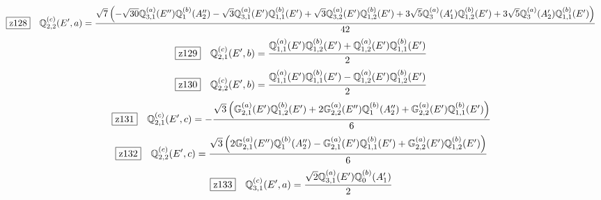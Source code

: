 \documentclass[fleqn,10pt,landscape]{jsarticle}
\begin{document}
\begin{dmath*}
\hspace*{3mm}\fbox{z128}\quad \mathbb{Q}_{2,2}^{(c)}(E^{\prime},a)=\frac{\sqrt{7} \left(- \sqrt{30} \mathbb{Q}_{3,1}^{(a)}(E^{\prime\prime}) \mathbb{Q}_{1}^{(b)}(A_{2}^{\prime\prime}) - \sqrt{3} \mathbb{Q}_{3,1}^{(a)}(E^{\prime}) \mathbb{Q}_{1,1}^{(b)}(E^{\prime}) + \sqrt{3} \mathbb{Q}_{3,2}^{(a)}(E^{\prime}) \mathbb{Q}_{1,2}^{(b)}(E^{\prime}) + 3 \sqrt{5} \mathbb{Q}_{3}^{(a)}(A_{1}^{\prime}) \mathbb{Q}_{1,2}^{(b)}(E^{\prime}) + 3 \sqrt{5} \mathbb{Q}_{3}^{(a)}(A_{2}^{\prime}) \mathbb{Q}_{1,1}^{(b)}(E^{\prime})\right)}{42}
\end{dmath*}
\begin{dmath*}
\hspace*{3mm}\fbox{z129}\quad \mathbb{Q}_{2,1}^{(c)}(E^{\prime},b)=\frac{\mathbb{Q}_{1,1}^{(a)}(E^{\prime}) \mathbb{Q}_{1,2}^{(b)}(E^{\prime}) + \mathbb{Q}_{1,2}^{(a)}(E^{\prime}) \mathbb{Q}_{1,1}^{(b)}(E^{\prime})}{2}
\end{dmath*}
\begin{dmath*}
\hspace*{3mm}\fbox{z130}\quad \mathbb{Q}_{2,2}^{(c)}(E^{\prime},b)=\frac{\mathbb{Q}_{1,1}^{(a)}(E^{\prime}) \mathbb{Q}_{1,1}^{(b)}(E^{\prime}) - \mathbb{Q}_{1,2}^{(a)}(E^{\prime}) \mathbb{Q}_{1,2}^{(b)}(E^{\prime})}{2}
\end{dmath*}
\begin{dmath*}
\hspace*{3mm}\fbox{z131}\quad \mathbb{Q}_{2,1}^{(c)}(E^{\prime},c)=- \frac{\sqrt{3} \left(\mathbb{G}_{2,1}^{(a)}(E^{\prime}) \mathbb{Q}_{1,2}^{(b)}(E^{\prime}) + 2 \mathbb{G}_{2,2}^{(a)}(E^{\prime\prime}) \mathbb{Q}_{1}^{(b)}(A_{2}^{\prime\prime}) + \mathbb{G}_{2,2}^{(a)}(E^{\prime}) \mathbb{Q}_{1,1}^{(b)}(E^{\prime})\right)}{6}
\end{dmath*}
\begin{dmath*}
\hspace*{3mm}\fbox{z132}\quad \mathbb{Q}_{2,2}^{(c)}(E^{\prime},c)=\frac{\sqrt{3} \left(2 \mathbb{G}_{2,1}^{(a)}(E^{\prime\prime}) \mathbb{Q}_{1}^{(b)}(A_{2}^{\prime\prime}) - \mathbb{G}_{2,1}^{(a)}(E^{\prime}) \mathbb{Q}_{1,1}^{(b)}(E^{\prime}) + \mathbb{G}_{2,2}^{(a)}(E^{\prime}) \mathbb{Q}_{1,2}^{(b)}(E^{\prime})\right)}{6}
\end{dmath*}
\begin{dmath*}
\hspace*{3mm}\fbox{z133}\quad \mathbb{Q}_{3,1}^{(c)}(E^{\prime},a)=\frac{\sqrt{2} \mathbb{Q}_{3,1}^{(a)}(E^{\prime}) \mathbb{Q}_{0}^{(b)}(A_{1}^{\prime})}{2}
\end{dmath*}
\end{document}

